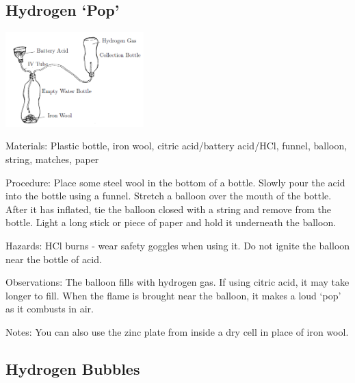 \begin{multicols}{2}
\subsection{Hydrogen `Pop'}

\begin{center}
\includegraphics[width=0.4\textwidth]{./img/hydrogen-production.png}
\end{center}

\begin{description*}
\item[Materials:]{Plastic bottle, iron wool, citric acid/battery acid/HCl, funnel, balloon, string, matches, paper}
\item[Procedure:]{Place some steel wool in the bottom of a bottle. Slowly pour the acid into the bottle using a funnel. Stretch a balloon over the mouth of the bottle. After it has inflated, tie the balloon closed with a string and remove from the bottle. Light a long stick or piece of paper and hold it underneath the balloon.}
\item[Hazards:]{HCl burns - wear safety goggles when using it. Do not ignite the balloon near the bottle of acid.}
\item[Observations:]{The balloon fills with hydrogen gas. If using citric acid, it may take longer to fill. When the flame is brought near the balloon, it makes a loud `pop' as it combusts in air.}
\item[Notes:]{You can also use the zinc plate from inside a dry cell in place of iron wool.}
\end{description*}

\subsection{Hydrogen Bubbles}


\end{multicols}
